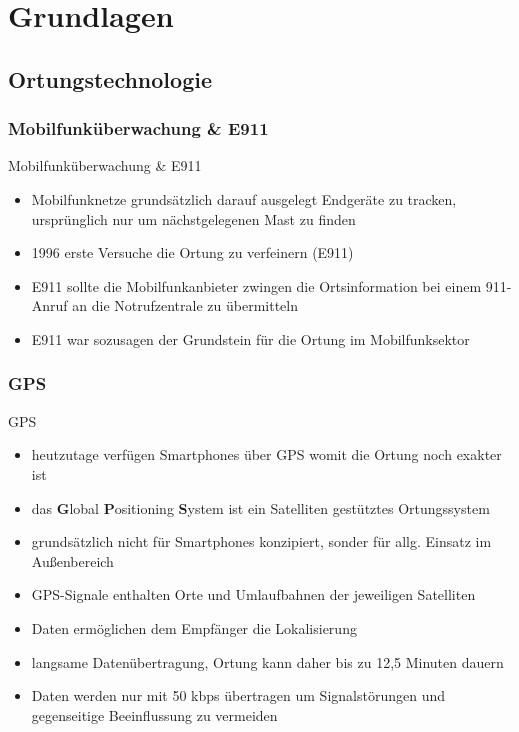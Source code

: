 \section{Grundlagen}
\subsection{Ortungstechnologie}
\subsubsection{Mobilfunküberwachung \& E911}
\begin{frame}{Mobilfunküberwachung \& E911}
\begin{itemize}
  \item Mobilfunknetze grundsätzlich darauf ausgelegt Endgeräte zu tracken, ursprünglich nur um nächstgelegenen Mast zu finden
  \item 1996 erste Versuche die Ortung zu verfeinern (E911)
  \item E911 sollte die Mobilfunkanbieter zwingen die Ortsinformation bei einem 911-Anruf an die Notrufzentrale zu übermitteln
  \item E911 war sozusagen der Grundstein für die Ortung im Mobilfunksektor
\end{itemize}
\end{frame}

\subsubsection{GPS}
\begin{frame}{GPS}
\begin{itemize}
  \item heutzutage verfügen Smartphones über GPS womit die Ortung noch exakter ist
  \item das \textbf{G}lobal \textbf{P}ositioning \textbf{S}ystem ist ein Satelliten gestütztes Ortungssystem
  \item grundsätzlich nicht für Smartphones konzipiert, sonder für allg. Einsatz im Außenbereich
  \item GPS-Signale enthalten Orte und Umlaufbahnen der jeweiligen Satelliten
  \item Daten ermöglichen dem Empfänger die Lokalisierung
  \item langsame Datenübertragung, Ortung kann daher bis zu 12,5 Minuten dauern
  \item Daten werden nur mit 50 kbps übertragen um Signalstörungen und gegenseitige Beeinflussung zu vermeiden
\end{itemize}
\end{frame}

